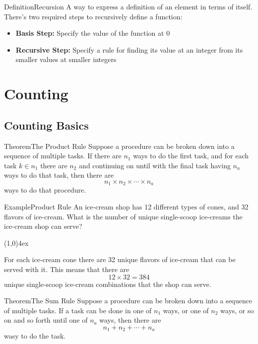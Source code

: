 \documentclass{MathNotes}
\newenvironment{example}[1]{\begin{BlueBox}{Example}{#1}}{\end{BlueBox}}
\newenvironment{definition}[1]{\begin{RedBox}{Definition}{#1}}{\end{RedBox}}
\newenvironment{theorem}[1]{\begin{GrayBox}{Theorem}{#1}}{\end{GrayBox}}
\newcommand{\br}{
	\begin{center}
		\line(1,0){4ex}
	\end{center}
}
\begin{document}
\begin{definition}{Recursion}
	A way to express a definition of an element in terms of itself. There's
	two required steps to recursively define a function:
	\begin{itemize}
		\item \textbf{Basis Step:} Specify the value of the function at 0
		\item \textbf{Recursive Step:} Specify a rule for finding its value at
		      an integer from its smaller values at smaller integers
	\end{itemize}
\end{definition}

\section{Counting}
\subsection{Counting Basics}
\begin{theorem}{The Product Rule}
	Suppose a procedure can be broken down into a sequence of multiple tasks.
	If there are $n_1$ ways to do the first task, and for each task $k\in n_1$
	there are $n_2$ and continuing on until with the final task having $n_a$
	ways to do that task,  then there are \[n_1\times n_2\times\cdots\times n_a\]
	ways to do that procedure.
\end{theorem}

\begin{example}{Product Rule}
	An ice-cream shop has 12 different types of cones, and 32 flavors of ice-cream.
	What is the number of unique single-scoop ice-creams the ice-cream shop can
	serve?
	\br{}
	For each ice-cream cone there are 32 unique flavors of ice-cream that can
	be served with it. This means that there are\[12\times 32=384\] unique
	single-scoop ice-cream combinations that the shop can serve.
\end{example}

\newpage
{}
\begin{theorem}{The Sum Rule}
	Suppose a procedure can be broken down into a sequence of multiple tasks.
	If a task can be done in one of $n_1$ ways, or one of $n_2$ ways, or so
	on and so forth until one of $n_a$ ways, then there are
	\[n_1+n_2+\cdots+n_a\] wasy to do the task.
\end{theorem}
\end{document}

